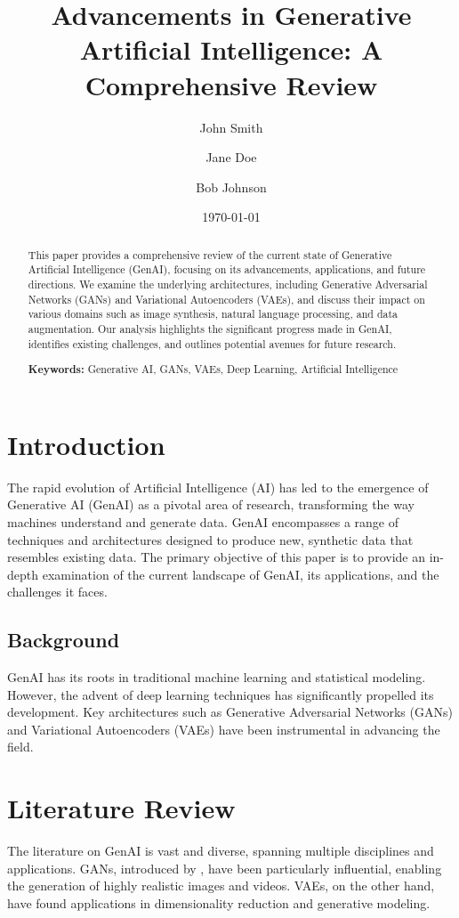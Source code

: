 \documentclass[12pt,a4paper]{article}
\title{Advancements in Generative Artificial Intelligence: A Comprehensive Review}
\author{John Smith \and Jane Doe \and Bob Johnson}
\date{\today}
\begin{document}
\maketitle
\thispagestyle{empty}

\begin{abstract}
This paper provides a comprehensive review of the current state of Generative Artificial Intelligence (GenAI), focusing on its advancements, applications, and future directions. We examine the underlying architectures, including Generative Adversarial Networks (GANs) and Variational Autoencoders (VAEs), and discuss their impact on various domains such as image synthesis, natural language processing, and data augmentation. Our analysis highlights the significant progress made in GenAI, identifies existing challenges, and outlines potential avenues for future research.

\textbf{Keywords:} Generative AI, GANs, VAEs, Deep Learning, Artificial Intelligence
\end{abstract}

\newpage
\tableofcontents
\newpage

\section{Introduction}
The rapid evolution of Artificial Intelligence (AI) has led to the emergence of Generative AI (GenAI) as a pivotal area of research, transforming the way machines understand and generate data. GenAI encompasses a range of techniques and architectures designed to produce new, synthetic data that resembles existing data. The primary objective of this paper is to provide an in-depth examination of the current landscape of GenAI, its applications, and the challenges it faces.

\subsection{Background}
GenAI has its roots in traditional machine learning and statistical modeling. However, the advent of deep learning techniques has significantly propelled its development. Key architectures such as Generative Adversarial Networks (GANs) \citep{goodfellow2014generative} and Variational Autoencoders (VAEs) \citep{kingma2014auto} have been instrumental in advancing the field.

\section{Literature Review}
The literature on GenAI is vast and diverse, spanning multiple disciplines and applications. GANs, introduced by \citet{goodfellow2014generative}, have been particularly influential, enabling the generation of highly realistic images and videos. VAEs, on the other hand, have found applications in dimensionality reduction and generative modeling.
\end{document}
